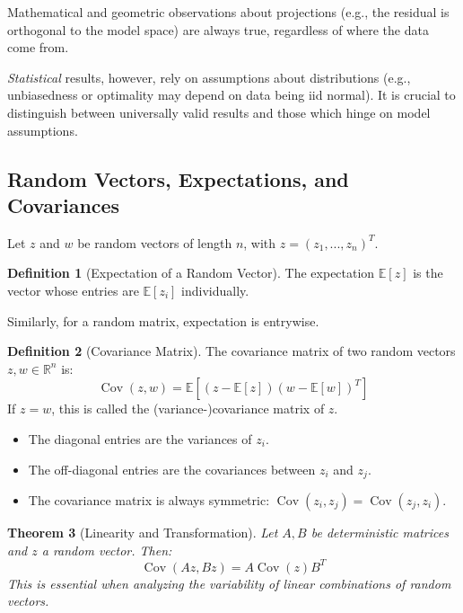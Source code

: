 \documentclass[11pt,a4paper]{article}
\theoremstyle{definition}
\newtheorem{definition}{Definition}[section]
\theoremstyle{plain}
\newtheorem{theorem}[definition]{Theorem}
\theoremstyle{remark}
\begin{document}
Mathematical and geometric observations about projections (e.g., the residual is orthogonal to the model space) are always true, regardless of where the data come from.

\emph{Statistical} results, however, rely on assumptions about distributions (e.g., unbiasedness or optimality may depend on data being iid normal). It is crucial to distinguish between universally valid results and those which hinge on model assumptions.

\subsection{Random Vectors, Expectations, and Covariances}

Let $z$ and $w$ be random vectors of length $n$, with $z = (z_1, ..., z_n)^T$.

\begin{definition}[Expectation of a Random Vector]
The expectation $\mathbb{E}[z]$ is the vector whose entries are $\mathbb{E}[z_i]$ individually.
\end{definition}

Similarly, for a random matrix, expectation is entrywise.

\begin{definition}[Covariance Matrix]
The covariance matrix of two random vectors $z, w \in \mathbb{R}^n$ is:
\[
\operatorname{Cov}(z, w) = \mathbb{E}[ (z - \mathbb{E}[z]) (w - \mathbb{E}[w])^T ]
\]
If $z = w$, this is called the (variance-)covariance matrix of $z$.
\end{definition}

\begin{itemize}
    \item The diagonal entries are the variances of $z_i$.
    \item The off-diagonal entries are the covariances between $z_i$ and $z_j$.
    \item The covariance matrix is always symmetric: $\operatorname{Cov}(z_i, z_j) = \operatorname{Cov}(z_j, z_i)$.
\end{itemize}

\begin{theorem}[Linearity and Transformation]
Let $A, B$ be deterministic matrices and $z$ a random vector. Then:
\[
\operatorname{Cov}(A z, B z) = A \operatorname{Cov}(z) B^T
\]
This is essential when analyzing the variability of linear combinations of random vectors.
\end{theorem}
\end{document}
